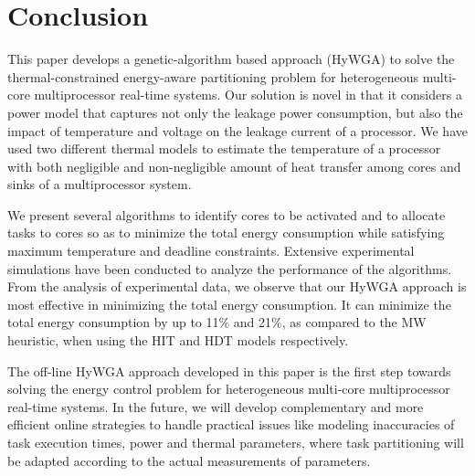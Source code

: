 \documentclass[conference]{IEEEtran}
\begin{document}
\section{Conclusion}


This paper develops a genetic-algorithm based approach (HyWGA) to solve the thermal-constrained energy-aware partitioning problem for heterogeneous multi-core multiprocessor real-time systems.
Our solution is novel in that it considers a power model that captures not only the leakage power consumption, but also the impact of temperature and voltage on the leakage current of a processor. We have used two different thermal models to estimate the temperature of a processor with both negligible and non-negligible amount of heat transfer among cores and sinks of a multiprocessor system.

We present several algorithms to identify cores to be activated and to allocate tasks to cores so as to minimize
the total energy consumption while satisfying maximum temperature and deadline constraints. Extensive experimental simulations have been conducted to analyze the performance of the algorithms. From the analysis of experimental data, we observe that our HyWGA approach is most effective in minimizing the total energy consumption. It can minimize the total energy consumption by up to 11\% and 21\%, as compared to the %
MW heuristic, when using the HIT and HDT models respectively.

The off-line HyWGA approach developed in this paper is the first step towards solving the energy control problem for heterogeneous multi-core multiprocessor real-time systems. In the future, we will develop complementary and more efficient online strategies to handle practical issues like modeling inaccuracies of task execution times, power and thermal parameters, where task partitioning will be adapted according to the actual measurements of parameters.







%
\end{document}
